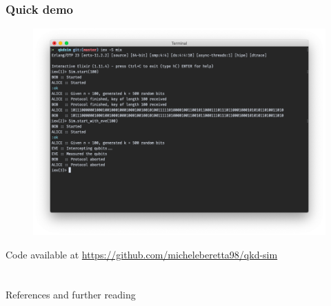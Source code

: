 \documentclass{beamer}
\begin{document}
  \begin{frame}[plain]
    \frametitle{Quick demo}
    \begin{figure}[H]
      \centering
      \includegraphics[width=0.8\linewidth]{qkd-bb84-elixir.png}
    \end{figure}

    \small{Code available at \url{https://github.com/micheleberetta98/qkd-sim}}
  \end{frame}

  \section*{}
  \begin{frame}[plain]{References and further reading}
    \nocite{*}
    
    
  \end{frame}
\end{document}
